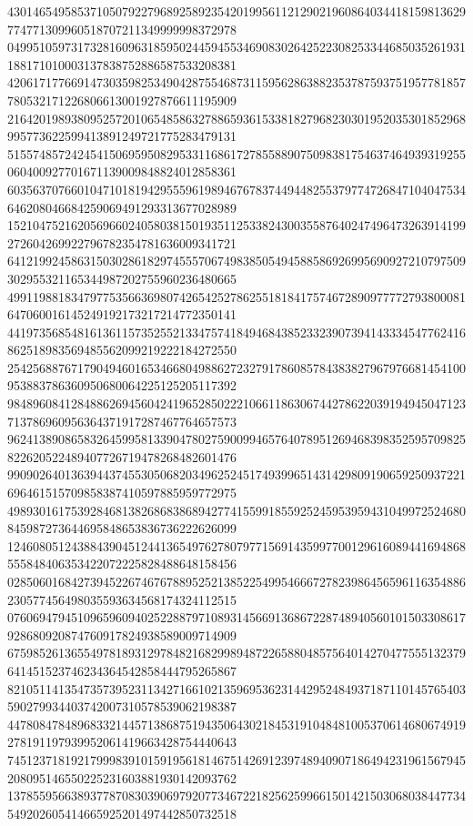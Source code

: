 \begin{DoxyCode}
      430146549585371050792279689258923542019956112129021960864034418159813629774771309960518707211349999998372978
      049951059731732816096318595024459455346908302642522308253344685035261931188171010003137838752886587533208381
      420617177669147303598253490428755468731159562863882353787593751957781857780532171226806613001927876611195909
      216420198938095257201065485863278865936153381827968230301952035301852968995773622599413891249721775283479131
      515574857242454150695950829533116861727855889075098381754637464939319255060400927701671139009848824012858361
      603563707660104710181942955596198946767837449448255379774726847104047534646208046684259069491293313677028989
      152104752162056966024058038150193511253382430035587640247496473263914199272604269922796782354781636009341721
      641219924586315030286182974555706749838505494588586926995690927210797509302955321165344987202755960236480665
      499119881834797753566369807426542527862551818417574672890977772793800081647060016145249192173217214772350141
      441973568548161361157352552133475741849468438523323907394143334547762416862518983569485562099219222184272550
      254256887671790494601653466804988627232791786085784383827967976681454100953883786360950680064225125205117392
      984896084128488626945604241965285022210661186306744278622039194945047123713786960956364371917287467764657573
      962413890865832645995813390478027590099465764078951269468398352595709825822620522489407726719478268482601476
      990902640136394437455305068203496252451749399651431429809190659250937221696461515709858387410597885959772975
      498930161753928468138268683868942774155991855925245953959431049972524680845987273644695848653836736222626099
      124608051243884390451244136549762780797715691435997700129616089441694868555848406353422072225828488648158456
      028506016842739452267467678895252138522549954666727823986456596116354886230577456498035593634568174324112515
      076069479451096596094025228879710893145669136867228748940560101503308617928680920874760917824938589009714909
      675985261365549781893129784821682998948722658804857564014270477555132379641451523746234364542858444795265867
      821051141354735739523113427166102135969536231442952484937187110145765403590279934403742007310578539062198387
      447808478489683321445713868751943506430218453191048481005370614680674919278191197939952061419663428754440643
      745123718192179998391015919561814675142691239748940907186494231961567945208095146550225231603881930142093762
      137855956638937787083039069792077346722182562599661501421503068038447734549202605414665925201497442850732518

\end{DoxyCode}
